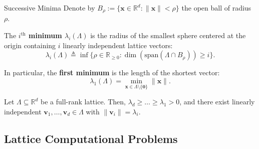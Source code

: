 \documentclass{zkdl-presentation-template}
\begin{document}
    \begin{frame}{Successive Minima}
        Denote by $B_{\rho} := \{\mathbf{x} \in \mathbb{R}^d: \|\mathbf{x}\|<\rho\}$ the open ball of radius $\rho$.
        \begin{definition}
            The \textbf{$i^{\text{th}}$ minimum $\lambda_i(\Lambda)$} is the radius of the smallest sphere centered at the origin containing $i$ linearly independent lattice vectors:
            \begin{equation*}
                \lambda_i(\Lambda) \triangleq \inf \{\rho \in \mathbb{R}_{\geq 0}: \dim(\text{span}(\Lambda \cap B_{\rho})) \geq i\}.
            \end{equation*}
        \end{definition}
        \pause

        In particular, the \textbf{first minimum} is the length of the shortest vector:
        \begin{equation*}
            \lambda_1(\Lambda) = \min_{\mathbf{x} \in \Lambda\setminus\{\mathbf{0}\}}\|\mathbf{x}\|.
        \end{equation*}
        \pause
        \vspace{-10pt}

        \begin{proposition}
            Let $\Lambda \subseteq \mathbb{R}^d$ be a full-rank lattice. Then, $\lambda_d \geq \ldots \geq \lambda_1 > 0$, and there exist linearly independent $\mathbf{v}_1, \dots, \mathbf{v}_d \in \Lambda$ with $\|\mathbf{v}_i\| = \lambda_i$.
        \end{proposition}
    \end{frame}

    \subsection{Lattice Computational Problems}
\end{document}
